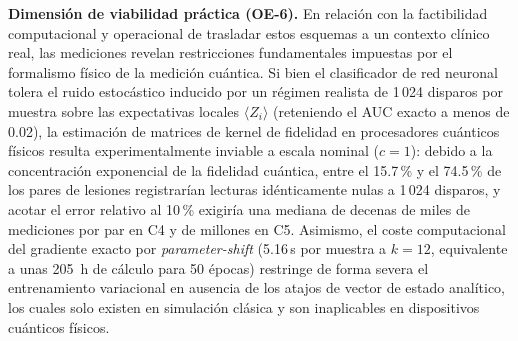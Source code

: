 \textbf{Dimensión de viabilidad práctica (OE-6).} En relación con la factibilidad computacional y operacional de trasladar
estos esquemas a un contexto clínico real, las mediciones revelan restricciones fundamentales impuestas por el formalismo
físico de la medición cuántica. Si bien el clasificador de red neuronal tolera el ruido estocástico inducido por un régimen
realista de 1\,024 disparos por muestra sobre las expectativas locales $\langle Z_i \rangle$ (reteniendo el AUC exacto a menos
de 0.02), la estimación de matrices de kernel de fidelidad en procesadores cuánticos físicos resulta experimentalmente inviable
a escala nominal ($c = 1$): debido a la concentración exponencial de la fidelidad cuántica, entre el 15.7\,\% y el 74.5\,\%
de los pares de lesiones registrarían lecturas idénticamente nulas a 1\,024 disparos, y acotar el error relativo al 10\,\% exigiría una mediana de decenas de miles de
mediciones por par en C4 y de millones en C5. Asimismo, el coste computacional del gradiente exacto por \textit{parameter-shift}
(5.16\,s por muestra a $k = 12$, equivalente a unas 205~h de cálculo para 50 épocas) restringe de forma severa el entrenamiento
variacional en ausencia de los atajos de vector de estado analítico, los cuales solo existen en simulación clásica y son
inaplicables en dispositivos cuánticos físicos.
